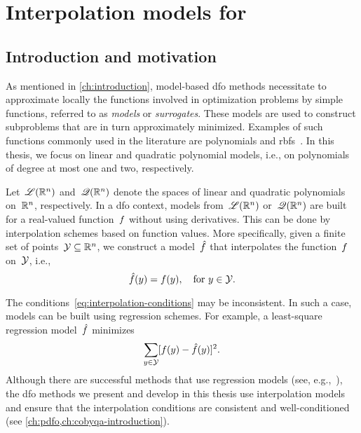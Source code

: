 %
%
%
\chapter{Interpolation models for }

\section{Introduction and motivation}

As mentioned in \cref{ch:introduction}, model-based \gls{dfo} methods necessitate to approximate locally the functions involved in optimization problems by simple functions, referred to as \emph{models} or \emph{surrogates}.
These models are used to construct subproblems that are in turn approximately minimized.
Examples of such functions commonly used in the literature are polynomials and \glspl{rbf}~\cite{Powell_2004a}.
In this thesis, we focus on linear and quadratic polynomial models, i.e., on polynomials of degree at most one and two, respectively.

Let~$\mathscr{L}(\mathbb{R}^n)$ and~$\mathscr{Q}(\mathbb{R}^n)$ denote the spaces of linear and quadratic polynomials on~$\mathbb{R}^n$, respectively.
In a \gls{dfo} context, models from~$\mathscr{L}(\mathbb{R}^n)$ or~$\mathscr{Q}(\mathbb{R}^n)$ are built for a real-valued function~$f$ without using derivatives.
This can be done by interpolation schemes based on function values.
More specifically, given a finite set of points~$\xpt \subseteq \R^n$, we construct a model~$\objm$ that interpolates the function~$f$ on~$\xpt$, i.e.,
\begin{equation}
    \label{eq:interpolation-conditions}
    \objm(y) = \obj(y), \quad \text{for~$y \in \xpt$}.
\end{equation}

The conditions~\cref{eq:interpolation-conditions} may be inconsistent.
In such a case, models can be built using regression schemes.
For example, a least-square regression model~$\objm$ minimizes
\begin{equation*}
    \sum_{\mathclap{y \in \xpt}} [\obj(y) - \objm(y)]^2.
\end{equation*}
Although there are successful methods that use regression models (see, e.g.,~\cite{Billups_Larson_Graf_2013,Conn_Scheinberg_Vicente_2008b}), the \gls{dfo} methods we present and develop in this thesis use interpolation models and ensure that the interpolation conditions are consistent and well-conditioned (see \cref{ch:pdfo,ch:cobyqa-introduction}).

